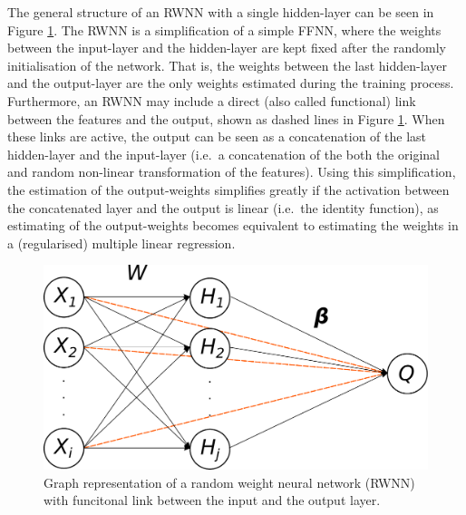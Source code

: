 \documentclass[
]{jss}
\begin{document}
The general structure of an RWNN with a single hidden-layer can be seen
in Figure \ref{fig:rwnn}. The RWNN is a simplification of a simple FFNN,
where the weights between the input-layer and the hidden-layer are kept
fixed after the randomly initialisation of the network. That is, the
weights between the last hidden-layer and the output-layer are the only
weights estimated during the training process. Furthermore, an RWNN may
include a direct (also called functional) link between the features and
the output, shown as dashed lines in Figure \ref{fig:rwnn}. When these
links are active, the output can be seen as a concatenation of the last
hidden-layer and the input-layer (i.e.~a concatenation of the both the
original and random non-linear transformation of the features). Using
this simplification, the estimation of the output-weights simplifies
greatly if the activation between the concatenated layer and the output
is linear (i.e.~the identity function), as estimating of the
output-weights becomes equivalent to estimating the weights in a
(regularised) multiple linear regression.

\begin{CodeChunk}
\begin{figure}

{\centering \includegraphics[width=0.6\linewidth]{./Figures/RWNN} 

}

\caption[Graph representation of a random weight neural network (RWNN) with funcitonal link between the input and the output layer]{Graph representation of a random weight neural network (RWNN) with funcitonal link between the input and the output layer.}\label{fig:rwnn}
\end{figure}
\end{CodeChunk}
\end{document}
